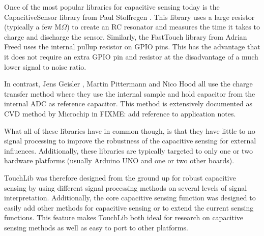 \documentclass[format=sigchi, screen=true, review=true]{acmart}
\begin{document}
Once of the most popular libraries for capacitive sensing today is the
CapacitiveSensor library from Paul Stoffregen \cite{CapacitiveSensorWebsite}.
This library uses a large resistor (typically a few $\textrm{M}\Omega$) to
create an RC resonator and measures the time it takes to charge and discharge
the sensor. Similarly, the FastTouch library from Adrian Freed
\cite{FastTouchWebsite} uses the internal pullup resistor on GPIO pins. This
has the advantage that it does not require an extra GPIO pin and resistor at
the disadvantage of a much lower signal to noise ratio.

In contrast, Jens Geisler \cite{QTouchADCArduinoWebsite}, Martin Pittermann
\cite{ADCTouchWebsite} and Nico Hood \cite{AnalogTouch} all use the charge
transfer method where they use the internal sample and hold capacitor from the
internal ADC as reference capacitor. This method is extensively documented as
CVD method by Microchip in FIXME: add reference to application notes.

What all of these libraries have in common though, is that they have little to
no signal processing to improve the robustness of the capacitive sensing for
external influences. Additionally, these libraries are typically targeted to
only one or two hardware platforms (usually Arduino UNO and one or two other
boards).

TouchLib was therefore designed from the ground up for robust capacitive
sensing by using different signal processing methods on several levels of
signal interpretation. Additionally, the core capacitive sensing function was
designed to easily add other methods for capacitive sensing or to extend the
current sensing functions. This feature makes TouchLib both ideal for research
on capacitive sensing methods as well as easy to port to other platforms.
\end{document}
